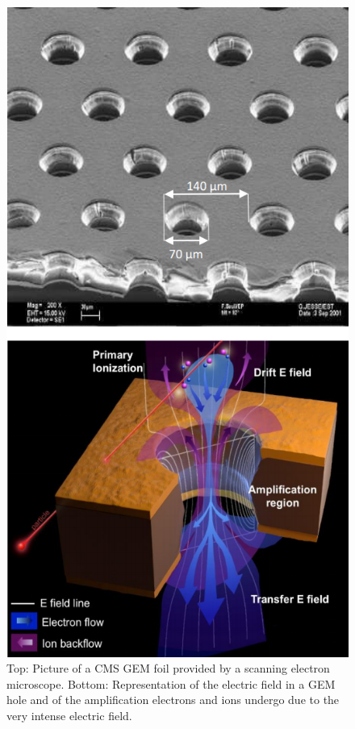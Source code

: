 \endgroup

\begingroup\setlength{\intextsep}{5pt}\setlength{\columnsep}{15pt}

	\begin{figure}
		\centering
		\includegraphics[width=0.7\linewidth]{fig/chapt4/GEM-foil-ampli.png}
		\caption{\label{fig:GEM-foil} Top: Picture of a CMS GEM foil provided by a scanning electron microscope. Bottom: Representation of the electric field in a GEM hole and of the amplification electrons and ions undergo due to the very intense electric field.}
	\end{figure}
	
